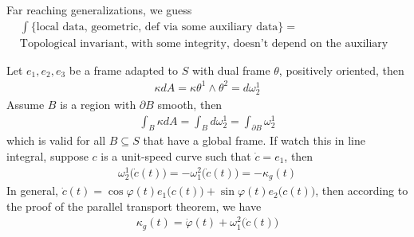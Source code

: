 \documentclass[10pt]{article}
\begin{document}
            Far reaching generalizations, we guess
            \begin{equation*}
                \begin{aligned}
                    &\int\big\{\text{local data, geometric, def via some auxiliary data}\big\} = \\
                    &\text{Topological invariant, with some integrity, doesn't depend on the auxiliary data}
                \end{aligned}
            \end{equation*}
            \begin{lemma}
                Let $e_1, e_2, e_3$ be a frame adapted to $S$ with dual frame $\theta$, positively oriented, then
                \begin{equation*}
                    \begin{aligned}
                        \kappa dA = \kappa\theta^1\wedge\theta^2 = d\omega_2^1
                    \end{aligned}
                \end{equation*}
                Assume $B$ is a region with $\partial B$ smooth, then
                \begin{equation}
                    \label{Equation: kappa_omega21}
                    \begin{aligned}
                        \int_B\kappa dA = \int_B d\omega_2^1 = \int_{\partial B}\omega_2^1
                    \end{aligned}
                \end{equation}
                which is valid for all $B\subseteq S$ that have a global frame. If watch this in line integral, suppose $c$ is a unit-speed curve such that $\dot{c} = e_1$, then
                \begin{equation*}
                    \begin{aligned}
                        \omega_2^1\big(\dot{c}(t)\big) = -\omega_1^2\big(\dot{c}(t)\big) = -\kappa_g(t)
                    \end{aligned}
                \end{equation*}
                In general, $\dot{c}(t) = \cos\varphi(t)e_1\big(c(t)\big) + \sin\varphi(t)e_2\big(c(t)\big)$, then according to the proof of the parallel transport theorem, we have
                \begin{equation*}
                    \begin{aligned}
                        \kappa_g(t) = \dot{\varphi}(t) + \omega_1^2\big(\dot{c}(t)\big)

\end{aligned}
\end{equation*}
\end{lemma}
\end{document}
